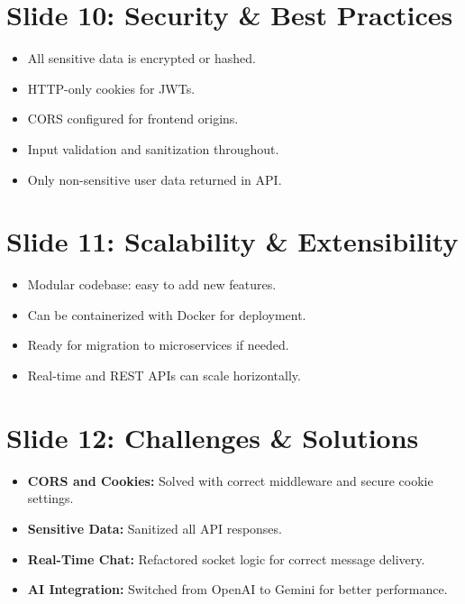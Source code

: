 \documentclass[12pt]{article}
\begin{document}

\section*{Slide 10: Security \& Best Practices}
\begin{itemize}[leftmargin=1cm]
    \item All sensitive data is encrypted or hashed.
    \item HTTP-only cookies for JWTs.
    \item CORS configured for frontend origins.
    \item Input validation and sanitization throughout.
    \item Only non-sensitive user data returned in API.
\end{itemize}


\section*{Slide 11: Scalability \& Extensibility}
\begin{itemize}[leftmargin=1cm]
    \item Modular codebase: easy to add new features.
    \item Can be containerized with Docker for deployment.
    \item Ready for migration to microservices if needed.
    \item Real-time and REST APIs can scale horizontally.
\end{itemize}


\section*{Slide 12: Challenges \& Solutions}
\begin{itemize}[leftmargin=1cm]
    \item \textbf{CORS and Cookies:} Solved with correct middleware and secure cookie settings.
    \item \textbf{Sensitive Data:} Sanitized all API responses.
    \item \textbf{Real-Time Chat:} Refactored socket logic for correct message delivery.
    \item \textbf{AI Integration:} Switched from OpenAI to Gemini for better performance.
\end{itemize}
\end{document}
